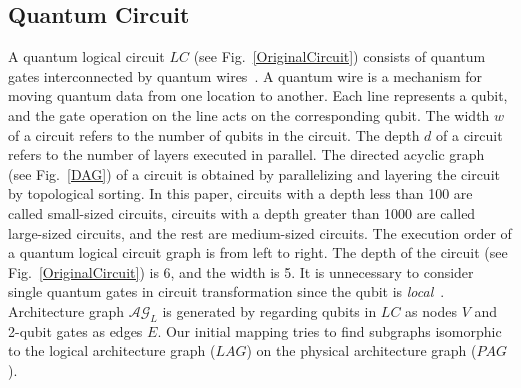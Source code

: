 \documentclass[runningheads]{llncs}
\begin{document}
\subsection{Quantum Circuit}
A quantum logical circuit $LC$ (see Fig.~\ref{OriginalCircuit})
consists of quantum gates interconnected by quantum wires~\cite{Daei2020}.
A quantum wire is a mechanism for moving quantum data from one location to another.
Each line represents a qubit, and the gate operation on the line acts on the corresponding qubit.
The width $w$ of a circuit refers to the number of qubits in the circuit.
The depth $d$ of a circuit refers to the number of layers executed in parallel.
The directed acyclic graph (see Fig.~\ref{DAG}) of a circuit is obtained by parallelizing and layering the circuit by topological sorting.
In this paper, circuits with a depth less than 100 are called small-sized circuits,
circuits with a depth greater than 1000 are called large-sized circuits,
and the rest are medium-sized circuits.
The execution order of a quantum logical circuit graph is from left to right.
The depth of the circuit (see Fig.~\ref{OriginalCircuit}) is 6, and the width is 5.
It is unnecessary to consider single quantum gates in circuit transformation since the qubit is \emph{local}~\cite{2013Optimization}.
Architecture graph $\mathcal{AG}_{L}$ is generated by regarding qubits in $LC$ as nodes $V$ and 2-qubit gates as edges $E$.
Our initial mapping tries to find subgraphs isomorphic to the logical architecture graph ($LAG$) on the physical architecture graph ($PAG$).
\end{document}
